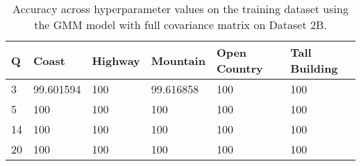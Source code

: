 \begin{table}[H]
\centering
\begin{tabular}{l l l l l l}
\hline
\hline
\textbf{Q} & \textbf{Coast} & \textbf{Highway} & \textbf{Mountain} & \textbf{Open Country} & \textbf{Tall Building} \\
\hline
\hline
3 & 99.601594 & 100 & 99.616858 & 100 & 100 \\
5 & 100 &  100 &  100 &  100 &  100 \\
14 & 100 & 100 & 100 & 100 & 100 \\
20 & 100 & 100 & 100 & 100 & 100 \\
\hline
\end{tabular}
\caption{Accuracy across hyperparameter values on the training dataset using the GMM model with full covariance matrix on Dataset 2B.}
\label{tab:2B_full_train}
\end{table}
